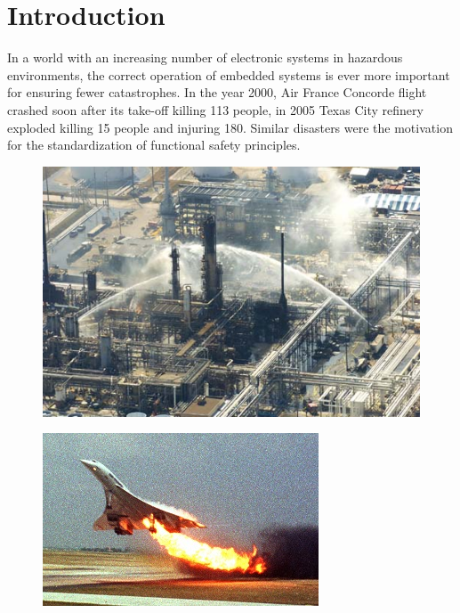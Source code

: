 \chapter*{Introduction} %

In a world with an increasing number of electronic systems in hazardous environments, the correct operation of embedded systems is ever more important for ensuring fewer catastrophes. In the year 2000, Air France Concorde flight crashed soon after its take-off killing 113 people, in 2005 Texas City refinery exploded killing 15 people and injuring 180. Similar disasters were the motivation for the standardization of functional safety principles. 

\begin{figure}[H]
    \centering
    \begin{minipage}{.5\textwidth}
          \centering
          \includegraphics[width=.7\linewidth]{images/texas_refinery.jpg}
          \label{fig:texas_refinery}
    \end{minipage}%
    \begin{minipage}{.5\textwidth}
          \centering
          \includegraphics[width=.74\linewidth]{images/concorde_disaster.jpg}
          \label{fig:concorde_disaster}
    \end{minipage}
\end{figure}

